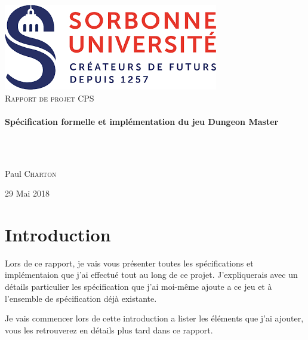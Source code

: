 \documentclass[12pt]{report}
\begin{document}
\begin{titlepage}
  \begin{sffamily}
  \begin{center}

    \includegraphics[scale=0.7]{image/univ.png}~\\[1.5cm]

    \textsc{\Large Rapport de projet CPS}\\[1.5cm]

    \HRule \\[0.4cm]
    { \huge \bfseries Spécification formelle et implémentation du jeu Dungeon Master\\[0.4cm] }

    \HRule \\[1.5cm]
    \\[1.5cm]

    \begin{minipage}{0.4\textwidth}
      \begin{flushleft} \large
        Paul \textsc{Charton}\\
      \end{flushleft}
    \end{minipage}

    \vfill

    {\large 29 Mai 2018}

  \end{center}
  \end{sffamily}
\end{titlepage}

\tableofcontents

\chapter*{Introduction}

Lors de ce rapport, je vais vous présenter toutes les spécifications et implémentaion que j'ai effectué tout au long de ce projet.
J'expliquerais avec un détails particulier les spécification que j'ai moi-même ajoute a ce jeu et à l'ensemble de spécification déjà existante.

Je vais commencer lors de cette introduction a lister les éléments que j'ai ajouter, vous les retrouverez en détails plus tard dans ce rapport.
\end{document}
